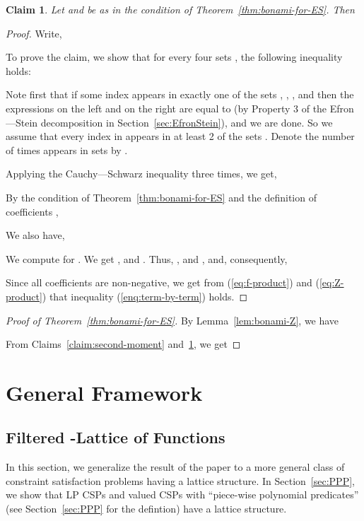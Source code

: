 \documentclass[11pt]{article}
\newtheorem{claim}[theorem]{Claim}
\begin{document}
\begin{claim}\label{claim:fourth-moment}
Let  and  be as in the condition of Theorem~\ref{thm:bonami-for-ES}. Then

\end{claim}
\begin{proof}
Write,


To prove the claim, we show that for every four sets , the following inequality holds:

Note first that if some index  appears in exactly one of the sets , , , and  then the expressions on the left and on the right
are equal to  (by Property 3 of the Efron---Stein decomposition in Section~\ref{sec:EfronStein}), and we are done. So we assume that every index  in  appears in at least 2 of the sets . Denote the number of times  appears in sets  by .

Applying the Cauchy---Schwarz inequality three times, we get,

By the condition of Theorem~\ref{thm:bonami-for-ES} and the definition of coefficients ,

We also have,

We compute  for . We get ,  and .
Thus, ,  and ,
and, consequently,

Since all coefficients  are non-negative, we get from (\ref{eq:f-product}) and (\ref{eq:Z-product})  that  inequality (\ref{enq:term-by-term}) holds.
\end{proof}

\begin{proof}[Proof of Theorem~\ref{thm:bonami-for-ES}]
By Lemma~\ref{lem:bonami-Z}, we have

From Claims~\ref{claim:second-moment} and~\ref{claim:fourth-moment}, we get

\end{proof}

\section{General Framework}\label{sec:general-framework}
\subsection{Filtered -Lattice of Functions}
In this section, we generalize the result of the paper to a more general class of constraint satisfaction problems having a lattice structure. In Section~\ref{sec:PPP},
we show that LP CSPs and valued CSPs with ``piece-wise polynomial predicates'' (see Section~\ref{sec:PPP} for the defintion) have a lattice structure.
\end{document}
